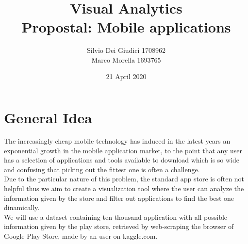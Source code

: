 \documentclass[a4paper, 11pt]{article}
\title { Visual Analytics\\ \bigskip \large Propostal: Mobile applications}
\date{21 April 2020}
\author{Silvio Dei Giudici 1708962 \\ Marco Morella 1693765}
\begin{document}
\maketitle

\section{General Idea}
The increasingly cheap mobile technology has induced in the latest years an exponential growth in the mobile application market, to the point that any user has a selection of applications and tools available to download which is so wide and confusing that picking out the fittest one is often a challenge.\\
Due to the particular nature of this problem, the standard app store is often not helpful thus we aim to create a visualization tool where the user can analyze the information given by the store and filter out applications to find the best one dinamically.\\
We will use a dataset containing ten thousand application with all possible information given by the play store, retrieved by web-scraping the browser of Google Play Store, made by an user on kaggle.com.\\
\end{document}

